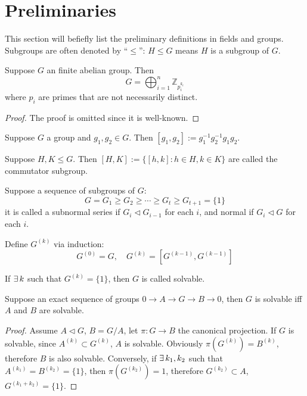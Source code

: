 \section{Preliminaries}
\begin{remark}
    This section will befiefly list the preliminary definitions in fields and groups. Subgroups are often denoted by ``$\le$'': $H\le G$ means $H$ is a subgroup of $G$.
\end{remark}
\begin{theorem}
    Suppose $G$ an finite abelian group. Then
    $$
    G=\bigoplus^{n}_{i=1}\mathbb{Z}_{p_i^{k_i}}
    $$
    where $p_i$ are primes that are not necessarily distinct.
\end{theorem}
\begin{proof}
    The proof is omitted since it is well-known.
\end{proof}
\begin{definition}
    Suppose $G$ a group and $g_1,g_2\in G$. Then $[g_1,g_2]:=g_1^{-1}g_2^{-1}g_1g_2$.
\end{definition}
\begin{definition}
    Suppose $H,K\le G$. Then $[H,K]:=\{[h,k]:h\in H,k\in K\}$ are called the commutator subgroup.
\end{definition}
\begin{definition}
    Suppose a sequence of subgroups of $G$:
    $$
    G=G_1\ge G_2\ge\cdots\ge G_t\ge G_{t+1}=\{1\}
    $$
    it is called a subnormal series if $G_i\triangleleft G_{i-1}$ for each $i$, and normal if $G_i\triangleleft G$ for each $i$.
\end{definition}
\begin{definition}
    Define $G^{(k)}$ via induction:
    $$
    G^{(0)}=G,\quad G^{(k)}=[G^{(k-1)},G^{(k-1)}]
    $$
\end{definition}
\begin{definition}
    If $\exists\, k$ such that $G^{(k)}=\{1\}$, then $G$ is called solvable.
\end{definition}
\begin{proposition}
    Suppose an exact sequence of groups $0\to A\to G\to B\to 0$, then $G$ is solvable iff $A$ and $B$ are solvable.
\end{proposition}
\begin{proof}
    Assume $A\triangleleft G$, $B=G/A$, let $\pi:G\to B$ the canonical projection. If $G$ is solvable, since $A^{(k)}\subset G^{(k)}$, $A$ is solvable. Obviously $\pi(G^{(k)})=B^{(k)}$, therefore $B$ is also solvable. Conversely, if $\exists\, k_1,k_2$ such that $A^{(k_1)}=B^{(k_2)}=\{1\}$, then $\pi(G^{(k_2)})=1$, therefore $G^{(k_2)}\subset A$, $G^{(k_1+k_2)}=\{1\}$.
\end{proof}
